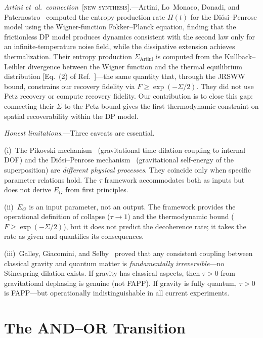 \documentclass[prl,twocolumn,superscriptaddress,longbibliography,floatfix]{revtex4-2}
\newcommand{\tauasym}{\tau}
\begin{document}
\emph{Artini et~al.\ connection}~[\textsc{new synthesis}].---Artini,
Lo~Monaco, Donadi, and Paternostro~\cite{Artini2025} computed the
entropy production rate $\Pi(t)$ for the Di\'{o}si--Penrose
model using the Wigner-function Fokker--Planck equation, finding that
the frictionless DP model produces dynamics consistent with the second
law only for an infinite-temperature noise field, while the
dissipative extension achieves thermalization.  Their entropy
production $\Sigma_{\mathrm{Artini}}$ is computed from the
Kullback--Leibler divergence between the Wigner function and the
thermal equilibrium distribution [Eq.~(2) of
Ref.~\cite{Artini2025}]---the same quantity that, through the JRSWW
bound, constrains our recovery fidelity via
$F \geq \exp(-\Sigma/2)$.  They did not use Petz recovery or
compute recovery fidelity.  Our contribution is to close this gap:
connecting their $\Sigma$ to the Petz bound gives the first
thermodynamic constraint on spatial recoverability within the DP model.

\emph{Honest limitations}.---Three caveats are essential.

(i)~The Pikovski mechanism~\cite{Pikovski2015} (gravitational time
dilation coupling to internal DOF) and the Di\'{o}si--Penrose
mechanism~\cite{Diosi1987,Penrose1996} (gravitational self-energy of
the superposition) are \emph{different physical processes}.  They
coincide only when specific parameter relations hold.  The
$\tauasym$ framework accommodates both as inputs but does not derive
$E_G$ from first principles.

(ii)~$E_G$ is an input parameter, not an output.  The framework
provides the operational definition of collapse
($\tauasym \to 1$) and the thermodynamic bound
($F \geq \exp(-\Sigma/2)$), but it does not predict the decoherence
rate; it takes the rate as given and quantifies its consequences.

(iii)~Galley, Giacomini, and Selby~\cite{GGS2023} proved that any
consistent coupling between classical gravity and quantum matter
is \emph{fundamentally irreversible}---no Stinespring dilation
exists.  If gravity has classical aspects, then $\tauasym > 0$ from
gravitational dephasing is genuine (not FAPP).  If gravity is fully
quantum, $\tauasym > 0$ is FAPP---but operationally indistinguishable
in all current experiments.

\section{The AND--OR Transition}
\label{sec:and_or}
\end{document}
